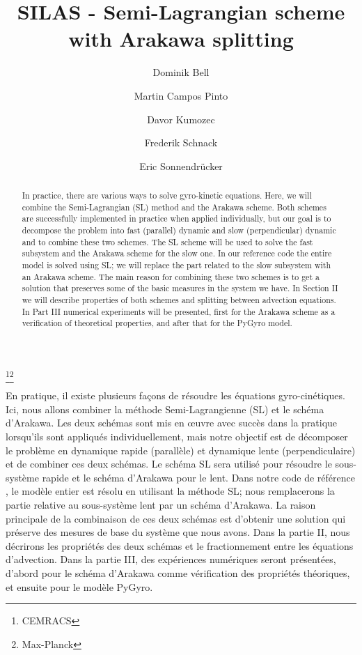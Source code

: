 \documentclass[proc]{edpsmath}
\begin{document}
\title{SILAS - Semi-Lagrangian scheme with Arakawa splitting}
\thanks{CEMRACS}\thanks{Max-Planck}%
%
\author{Dominik Bell}\address{Max-Planck-Institut für Plasmaphysik, Garching, Germany; }
\author{Martin Campos Pinto}
\author{Davor Kumozec}\address{Faculty of Sciences, University of Novi Sad, Serbia; }
\author{Frederik Schnack}
\author{Eric Sonnendrücker}

\begin{abstract}
In practice, there are various ways to solve gyro-kinetic equations. Here, we will combine the Semi-Lagrangian (SL) method and the Arakawa scheme. Both schemes are successfully implemented in practice when applied individually, but our goal is to decompose the problem into fast (parallel) dynamic and slow (perpendicular) dynamic and to combine these two schemes. The SL scheme will be used to solve the fast subsystem and the Arakawa scheme for the slow one. In our reference code \cite{pygyro_code} the entire model is solved using SL; we will replace the part related to the slow subsystem with an Arakawa scheme. The main reason for combining these two schemes is to get a solution that preserves some of the basic measures in the system we have. In Section II we will describe properties of both schemes and splitting between advection equations. In Part III numerical experiments will be presented, first for the Arakawa scheme as a verification of theoretical properties, and after that for the PyGyro model.
\end{abstract}

\begin{resume}
	En pratique, il existe plusieurs façons de résoudre les équations gyro-cinétiques. Ici, nous allons combiner la méthode Semi-Lagrangienne (SL) et le schéma d'Arakawa. Les deux schémas sont mis en œuvre avec succès dans la pratique lorsqu'ils sont appliqués individuellement, mais notre objectif est de décomposer le problème en dynamique rapide (parallèle) et dynamique lente (perpendiculaire) et de combiner ces deux schémas. Le schéma SL sera utilisé pour résoudre le sous-système rapide et le schéma d'Arakawa pour le lent. Dans notre code de référence \cite{pygyro_code}, le modèle entier est résolu en utilisant la méthode SL; nous remplacerons la partie relative au sous-système lent par un schéma d'Arakawa. La raison principale de la combinaison de ces deux schémas est d'obtenir une solution qui préserve des mesures de base du système que nous avons. Dans la partie II, nous décrirons les propriétés des deux schémas et le fractionnement entre les équations d'advection. Dans la partie III, des expériences numériques seront présentées, d'abord pour le schéma d'Arakawa comme vérification des propriétés théoriques, et ensuite pour le modèle PyGyro.
\end{resume}
\end{document}
